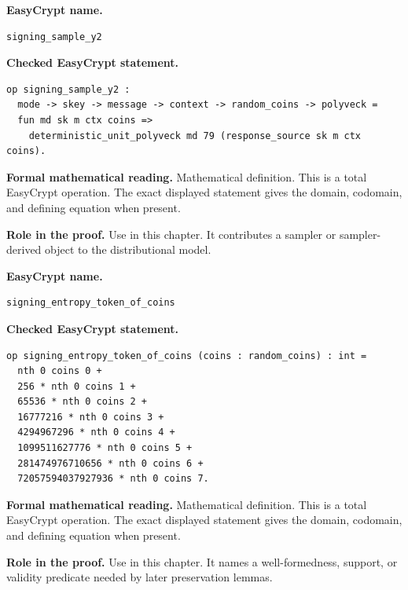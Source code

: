 \begin{formaldefinition}
\noindent\textbf{EasyCrypt name.}
\begin{lstlisting}[language=EasyCrypt,basicstyle=\ttfamily\scriptsize]
signing_sample_y2
\end{lstlisting}
\noindent\textbf{Checked EasyCrypt statement.}
\begin{lstlisting}[language=EasyCrypt,basicstyle=\ttfamily\scriptsize]
op signing_sample_y2 :
  mode -> skey -> message -> context -> random_coins -> polyveck =
  fun md sk m ctx coins =>
    deterministic_unit_polyveck md 79 (response_source sk m ctx coins).
\end{lstlisting}
\noindent\textbf{Formal mathematical reading.}
Mathematical definition. This is a total EasyCrypt operation.  The exact displayed statement gives the domain, codomain, and defining equation when present.

\noindent\textbf{Role in the proof.}
Use in this chapter. It contributes a sampler or sampler-derived object to the distributional model.

\end{formaldefinition}

\begin{formaldefinition}
\noindent\textbf{EasyCrypt name.}
\begin{lstlisting}[language=EasyCrypt,basicstyle=\ttfamily\scriptsize]
signing_entropy_token_of_coins
\end{lstlisting}
\noindent\textbf{Checked EasyCrypt statement.}
\begin{lstlisting}[language=EasyCrypt,basicstyle=\ttfamily\scriptsize]
op signing_entropy_token_of_coins (coins : random_coins) : int =
  nth 0 coins 0 +
  256 * nth 0 coins 1 +
  65536 * nth 0 coins 2 +
  16777216 * nth 0 coins 3 +
  4294967296 * nth 0 coins 4 +
  1099511627776 * nth 0 coins 5 +
  281474976710656 * nth 0 coins 6 +
  72057594037927936 * nth 0 coins 7.
\end{lstlisting}
\noindent\textbf{Formal mathematical reading.}
Mathematical definition. This is a total EasyCrypt operation.  The exact displayed statement gives the domain, codomain, and defining equation when present.

\noindent\textbf{Role in the proof.}
Use in this chapter. It names a well-formedness, support, or validity predicate needed by later preservation lemmas.

\end{formaldefinition}

